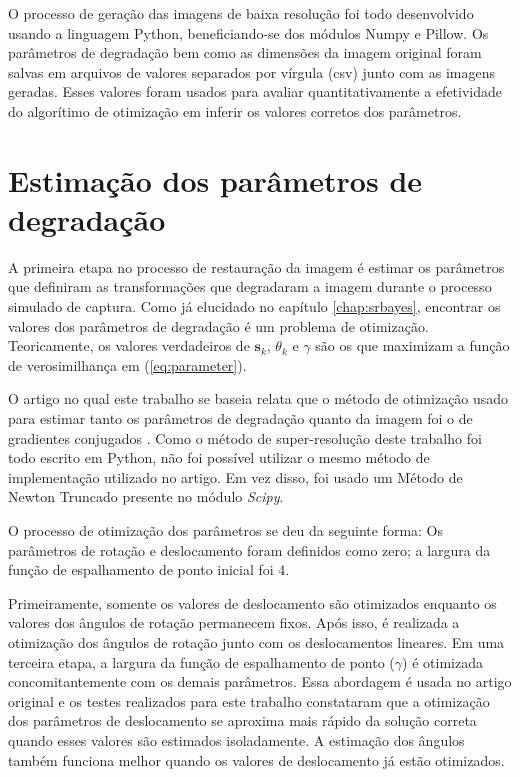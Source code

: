 O processo de geração das imagens de baixa resolução foi todo desenvolvido usando a linguagem Python,
beneficiando-se dos módulos Numpy e Pillow.
Os parâmetros de degradação bem como as dimensões da imagem original foram salvas em arquivos de valores separados por vírgula (csv) junto com as imagens geradas.
Esses valores foram usados para avaliar quantitativamente a efetividade do algorítimo de
otimização em inferir os valores corretos dos parâmetros.

\section{Estimação dos parâmetros de degradação}
\label{sec:parestimation}
A primeira etapa no processo de restauração da imagem é estimar os parâmetros que definiram as transformações que degradaram a imagem durante o processo simulado de captura. Como já elucidado no capítulo \ref{chap:srbayes}, encontrar os valores dos parâmetros de degradação é um problema de otimização.
Teoricamente, os valores verdadeiros de $\mathbf{s}_k$, $\theta_k$ e $\gamma$ são os que maximizam a função de verosimilhança em (\ref{eq:parameter}).

O artigo no qual este trabalho se baseia relata que o método de otimização usado
para estimar tanto os parâmetros de degradação quanto da imagem foi o de gradientes
conjugados \cite{tipping2003bayesian}.
Como o método de super-resolução deste trabalho foi todo escrito em Python,
não foi possível utilizar o mesmo método de implementação utilizado no artigo.
Em vez disso, foi usado um Método de Newton Truncado presente no módulo \emph{Scipy}.


O processo de otimização dos parâmetros se deu da seguinte forma:
Os parâmetros de rotação e deslocamento foram definidos como zero;
a largura da função de espalhamento de ponto inicial foi 4.

Primeiramente, somente os valores de deslocamento são otimizados enquanto os valores dos ângulos de rotação permanecem fixos.
Após isso, é realizada a otimização dos ângulos de rotação junto com os deslocamentos lineares.
Em uma terceira etapa, a largura da função de espalhamento de ponto ($\gamma$) é otimizada
concomitantemente com os demais parâmetros.
Essa abordagem é usada no artigo original e os testes realizados para este trabalho
constataram que a otimização dos parâmetros de deslocamento se aproxima mais rápido da
solução correta quando esses valores são estimados isoladamente.
A estimação dos ângulos também funciona melhor quando os valores de deslocamento já estão
otimizados.


